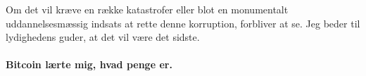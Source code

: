 Om det vil kræve en række katastrofer eller blot en monumentalt 
uddannelsesmæssig indsats at rette denne korruption, forbliver at se. 
Jeg beder til lydighedens guder, at det vil være det sidste.

\paragraph{Bitcoin lærte mig, hvad penge er.}

%
%
%
%
